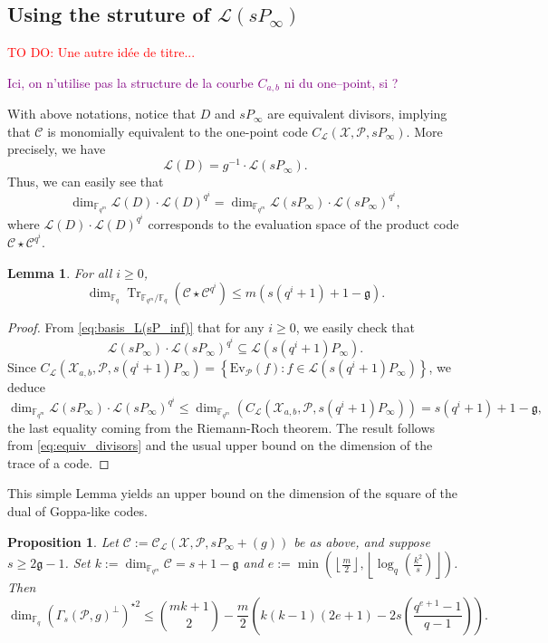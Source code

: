 \documentclass[a4paper]{article}
\newtheorem{proposition}[thm]{Proposition}
\newtheorem{lemma}[thm]{Lemma}
\theoremstyle{definition}
\theoremstyle{remark}
\newcommand{\calP}{\mathcal{P}}
\newcommand{\calL}{\mathcal{L}}
\newcommand{\calC}{\mathcal{C}}
\newcommand{\calX}{\mathcal{X}}
\newcommand{\fqm}{\mathbb{F}_{q^m}}
\newcommand{\fq}{\mathbb{F}_{q}}
\newcommand{\Tr}[1]{\operatorname{Tr}_{\mathbb{F}_{q^m}/\fq}\left(#1\right)}
\newcommand{\set}[1]{\left\{#1\right\}}
\newcommand\jade[1]{\textcolor{purple}{#1}}
\newcommand\TODO[1]{\textcolor{red}{TO DO: #1}}
\begin{document}
\subsection{Using the struture of $\calL(sP_\infty)$}

\TODO{Une autre idée de titre...}

\jade{Ici, on n'utilise pas la structure de la courbe $C_{a,b}$ ni du one--point, si ?}

With above notations, notice that $D$ and $sP_\infty$ are equivalent divisors, implying that $\calC$ is monomially equivalent to the one-point code $C_{\calL}(\calX,\calP,sP_\infty)$. 
More precisely, we have $$\calL(D) = g^{-1} \cdot \calL(sP_{\infty}).$$
Thus, we can easily see that
\begin{equation} \label{eq:equiv_divisors}
\dim_{\fqm} \calL(D)\cdot \calL(D)^{q^i} = \dim_{\fqm} \calL(sP_\infty)\cdot \calL(sP_\infty)^{q^i},
\end{equation}
where $\calL(D)\cdot \calL(D)^{q^i}$ corresponds to the evaluation space of the product code $\calC \star \calC^{q^i}$.


\begin{lemma} \label{lem:bound_dim_Tr(C*C^q^i)}
   For all $i \geq 0$, 
   $$\dim_{\fq} \Tr{\calC\star \calC^{q^i}} \leq m\left(s\left(q^i+1\right)+1-\mathfrak{g}\right).$$
\end{lemma}

\begin{proof}
From \eqref{eq:basis_L(sP_inf)} that for any $i \geq 0$, we easily check that
$$ \calL(sP_\infty)\cdot \calL(sP_\infty)^{q^i} \subseteq \calL(s(q^i+1)P_\infty).$$
Since $C_{\calL}(\calX_{a,b},\calP,s(q^i+1)P_{\infty}) = \set{\mathrm{Ev}_{\calP}(f) : f \in \calL(s(q^i+1)P_\infty)}$, we deduce 
$$ \dim_{\fqm} \calL(sP_\infty) \cdot \calL(sP_\infty)^{q^i} \leq \dim_{\fqm}\left(C_{\calL}(\calX_{a,b},\calP,s(q^i+1)P_{\infty})\right) = s(q^i+1)+1-\mathfrak{g},$$
the last equality coming from the Riemann-Roch theorem. The result follows from \eqref{eq:equiv_divisors} and the usual upper bound on the dimension of the trace of a code. 
\end{proof}

\noindent This simple Lemma yields an upper bound on the dimension of the square of the dual of Goppa-like codes.



\begin{proposition} \label{prop:bound_dim_using_inclusions}
    Let $\calC := \calC_{\calL}(\calX,\calP,sP_\infty+(g))$ be as above, and suppose $s \geq 2\mathfrak{g}-1$. Set $k := \dim_{\fqm}\calC = s+1-\mathfrak{g}$ and  $e := \min\left(\left\lfloor \frac{m}{2} \right\rfloor,\left\lfloor \log_q\left(\frac{k^2}{s}\right)\right\rfloor\right)$. Then
    $$\dim_{\fq} (\Gamma_s(\calP,g)^{\perp})^{\star 2} \leq \binom{mk+1}{2} - \dfrac{m}{2}\left(k(k-1)(2e+1)-2s\left(\dfrac{q^{e+1}-1}{q-1}\right)\right).$$
\end{proposition}
\end{document}
